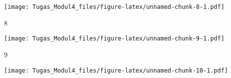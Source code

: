 \documentclass[
]{article}
\newenvironment{Shaded}{\begin{snugshade}}{\end{snugshade}}
\newcommand{\DataTypeTok}[1]{\textcolor[rgb]{0.13,0.29,0.53}{#1}}
\newcommand{\DecValTok}[1]{\textcolor[rgb]{0.00,0.00,0.81}{#1}}
\newcommand{\KeywordTok}[1]{\textcolor[rgb]{0.13,0.29,0.53}{\textbf{#1}}}
\newcommand{\NormalTok}[1]{#1}
\newcommand{\OperatorTok}[1]{\textcolor[rgb]{0.81,0.36,0.00}{\textbf{#1}}}
\newcommand{\StringTok}[1]{\textcolor[rgb]{0.31,0.60,0.02}{#1}}
\begin{document}
\texttt{[image: Tugas\_Modul4\_files/figure-latex/unnamed-chunk-8-1.pdf]}

8

\begin{Shaded}
\end{Shaded}

\texttt{[image: Tugas\_Modul4\_files/figure-latex/unnamed-chunk-9-1.pdf]}

9

\begin{Shaded}
\end{Shaded}

\texttt{[image: Tugas\_Modul4\_files/figure-latex/unnamed-chunk-10-1.pdf]}
\end{document}
